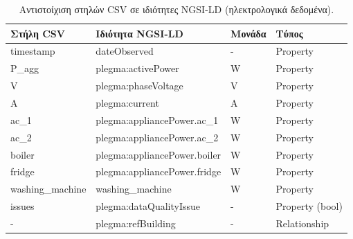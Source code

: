 \begin{table}[H]
\centering
\caption{Αντιστοίχιση στηλών \textlatin{CSV} σε ιδιότητες \textlatin{NGSI-LD} (ηλεκτρολογικά δεδομένα).}
\label{tab:electric-mapping}
\begin{tabular}{|>{\centering\arraybackslash}m{3.5cm}|>{\centering\arraybackslash}m{5cm}|>{\centering\arraybackslash}m{2cm}|>{\centering\arraybackslash}m{2cm}|}
\hline
\textbf{Στήλη \textlatin{CSV}} & \textbf{Ιδιότητα \textlatin{NGSI-LD}} & \textbf{Μονάδα} & \textbf{Τύπος} \\
\hline
\textlatin{timestamp} & \textlatin{dateObserved} & - & \textlatin{Property} \\
\hline
\textlatin{P\_agg} & \textlatin{plegma:activePower} & \textlatin{W} & \textlatin{Property} \\
\hline
\textlatin{V} & \textlatin{plegma:phaseVoltage} & \textlatin{V} & \textlatin{Property} \\
\hline
\textlatin{A} & \textlatin{plegma:current} & \textlatin{A} & \textlatin{Property} \\
\hline
\textlatin{ac\_1} & \textlatin{plegma:appliancePower.ac\_1} & \textlatin{W} & \textlatin{Property} \\
\hline
\textlatin{ac\_2} & \textlatin{plegma:appliancePower.ac\_2} & \textlatin{W} & \textlatin{Property} \\
\hline
\textlatin{boiler} & \textlatin{plegma:appliancePower.boiler} & \textlatin{W} & \textlatin{Property} \\
\hline
\textlatin{fridge} & \textlatin{plegma:appliancePower.fridge} & \textlatin{W} & \textlatin{Property} \\
\hline
\textlatin{washing\_machine} & \textlatin{washing\_machine} & \textlatin{W} & \textlatin{Property} \\
\hline
\textlatin{issues} & \textlatin{plegma:dataQualityIssue} & - & \textlatin{Property (bool)} \\
\hline
- & \textlatin{plegma:refBuilding} & - & \textlatin{Relationship} \\
\hline
\end{tabular}
\end{table}

